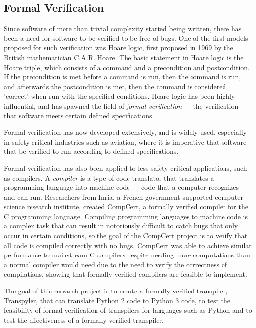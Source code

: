 \subsection{Formal Verification}
Since software of more than trivial complexity started being written, there has been a need for software to be verified to be free of bugs. One of the first models proposed for such verification was Hoare logic, first proposed in 1969 by the British mathematician C.A.R. Hoare. The basic statement in Hoare logic is the Hoare triple, which consists of a command and a precondition and postcondition. If the precondition is met before a command is run, then the command is run, and afterwards the postcondition is met, then the command is considered 'correct' when run with the specified conditions. Hoare logic has been highly influential, and has spawned the field of \textit{formal verification} --- the verification that software meets certain defined specifications.

Formal verification has now developed extensively, and is widely used, especially in safety-critical industries such as aviation, where it is imperative that software that be verified to run according to defined specifications. 

Formal verification has also been applied to less safety-critical applications, such as compilers. A \textit{compiler} is a type of code translator that translates a programming language into machine code --- code that a computer recognizes and can run. Researchers from Inria, a French government-supported computer science research institute, created CompCert, a formally verified compiler for the C programming language. Compiling programming languages to machine code is a complex task that can result in notoriously difficult to catch bugs that only occur in certain conditions, so the goal of the CompCert project is to verify that all code is compiled correctly with no bugs. CompCert was able to achieve similar performance to mainstream C compilers despite needing more computations than a normal compiler would need due to the need to verify the correctness of compilations, showing that formally verified compilers are feasible to implement.

The goal of this research project is to create a formally verified transpiler, Transpyler, that can translate Python 2 code to Python 3 code, to test the feasibility of formal verification of transpilers for languages such as Python and to test the effectiveness of a formally verified transpiler.
